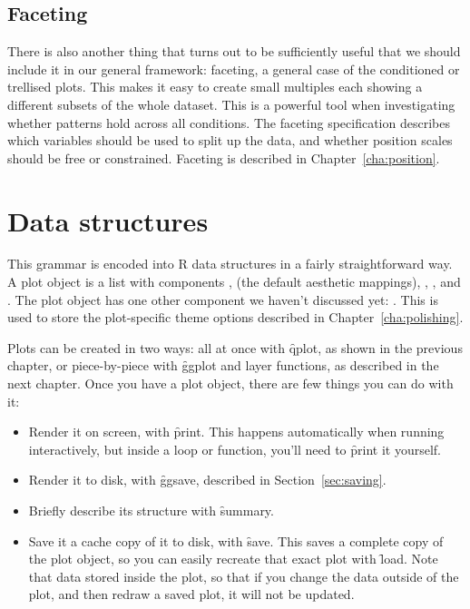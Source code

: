 \subsection{Faceting}\label{sec:intro-faceting}

There is also another thing that turns out to be sufficiently useful that we should include it in our general framework: faceting, a general case of the conditioned or trellised plots. This makes it easy to create small multiples each showing a different subsets of the whole dataset. This is a powerful tool when investigating whether patterns hold across all conditions. The faceting specification describes which variables should be used to split up the data, and whether position scales should be free or constrained. Faceting is described in Chapter~\ref{cha:position}.

\section{Data structures}
\label{sec:data-structures}

This grammar is encoded into R data structures in a fairly straightforward way. A plot object is a list with components ,  (the default aesthetic mappings), , ,  and . The plot object has one other component we haven't discussed yet: . This is used to store the plot-specific theme options described in Chapter~\ref{cha:polishing}.

Plots can be created in two ways: all at once with \f{qplot}, as shown in the previous chapter, or piece-by-piece with \f{ggplot} and layer functions, as described in the next chapter.  Once you have a plot object, there are few things you can do with it:

\begin{itemize}
  \item Render it on screen, with \f{print}.  This happens automatically when
  running interactively, but inside a loop or function, you'll need to
  \f{print} it yourself.
  
  \item Render it to disk, with \f{ggsave}, described in Section~\ref{sec:saving}.

  \item Briefly describe its structure with \f{summary}.
  
  \item Save it a cache copy of it to disk, with \f{save}.  This saves a complete copy of the plot object, so you can easily recreate that exact plot with \f{load}.  Note that data stored inside the plot, so that if you change the data outside of the plot, and then redraw a saved plot, it will not be updated. 
\end{itemize}

